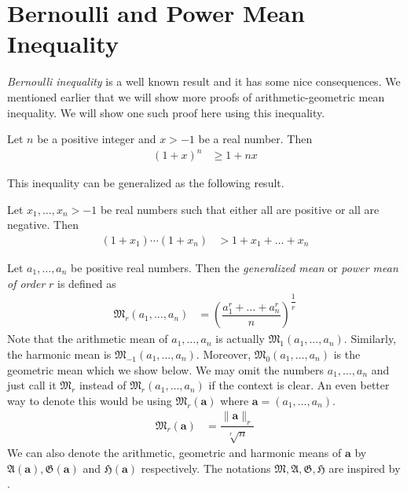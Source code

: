 \documentclass{subfile}
\begin{document}
	\section{Bernoulli and Power Mean Inequality}\label{sec:powermean}
	\emph{Bernoulli inequality} is a well known result and it has some nice consequences. We mentioned earlier that we will show more proofs of arithmetic-geometric mean inequality. We will show one such proof here using this inequality.
		\begin{theorem}
			Let $n$ be a positive integer and $x>-1$ be a real number. Then
				\begin{align*}
					(1+x)^n
						& \geq1+nx
				\end{align*}
		\end{theorem}
	This inequality can be generalized as the following result.
		\begin{theorem}
			Let $x_1,\ldots,x_n>-1$ be real numbers such that either all are positive or all are negative. Then
				\begin{align*}
					(1+x_1)\cdots(1+x_n)
						& > 1+x_1+\ldots+x_n
				\end{align*}
		\end{theorem}%
	
			Let $a_1,\ldots,a_n$ be positive real numbers. Then the \emph{generalized mean} or \emph{power mean of order} $r$ is defined as
				\begin{align*}
					\mathfrak{M}_r(a_1,\ldots,a_n)
						& = \left(\dfrac{a_1^r+\ldots+a_n^r}{n}\right)^{\dfrac{1}{r}}
				\end{align*}
			Note that the arithmetic mean of $a_1,\ldots,a_n$ is actually $\mathfrak{M}_1(a_1,\ldots,a_n)$. Similarly, the harmonic mean is $\mathfrak{M}_{-1}(a_1,\ldots,a_n)$. Moreover, $\mathfrak{M}_0(a_1,\ldots,a_n)$ is the geometric mean which we show below.
	We may omit the numbers $a_{1},\ldots,a_{n}$ and just call it $\mathfrak{M}_r$ instead of $\mathfrak{M}_r(a_1,\ldots,a_n)$ if the context is clear. An even better way to denote this would be using $\mathfrak{M}_{r}(\mathbf{a})$ where $\mathbf{a}=(a_{1},\ldots,a_{n})$.
		\begin{align*}
			\mathfrak{M}_{r}(\mathbf{a})
				& = \dfrac{\|\mathbf{a}\|_{r}}{\sqrt[r]{n}}
		\end{align*}
	We can also denote the arithmetic, geometric and harmonic means of $\mathbf{a}$ by $\mathfrak{A}(\mathbf{a}),\mathfrak{G}(\mathbf{a})$ and $\mathfrak{H}(\mathbf{a})$ respectively. The notations $\mathfrak{M},\mathfrak{A},\mathfrak{G},\mathfrak{H}$ are inspired by \textcite{hardy_littlewood_polya_2018}. 
	
\end{document}
